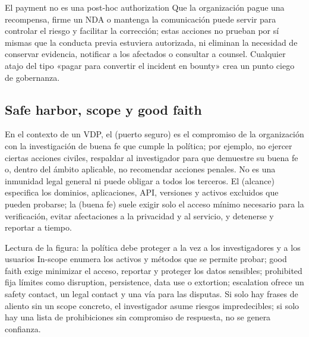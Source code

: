 \begin{warningbox}{El payment no es una post-hoc authorization}
Que la organización pague una recompensa, firme un NDA o mantenga la comunicación puede servir para controlar el riesgo y facilitar la corrección; estas acciones no prueban por sí mismas que la conducta previa estuviera autorizada, ni eliminan la necesidad de conservar evidencia, notificar a los afectados o consultar a counsel. Cualquier atajo del tipo «pagar para convertir el incident en bounty» crea un punto ciego de gobernanza.
\end{warningbox}

\subsection{Safe harbor, scope y good faith}

En el contexto de un VDP, el  (puerto seguro) es el compromiso de la organización con la investigación de buena fe que cumple la política; por ejemplo, no ejercer ciertas acciones civiles, respaldar al investigador para que demuestre su buena fe o, dentro del ámbito aplicable, no recomendar acciones penales. No es una inmunidad legal general ni puede obligar a todos los terceros. El  (alcance) especifica los dominios, aplicaciones, API, versiones y activos excluidos que pueden probarse; la  (buena fe) suele exigir solo el acceso mínimo necesario para la verificación, evitar afectaciones a la privacidad y al servicio, y detenerse y reportar a tiempo.


\begin{knowledgebox}{Lectura de la figura: la política debe proteger a la vez a los investigadores y a los usuarios}
In-scope enumera los activos y métodos que se permite probar; good faith exige minimizar el acceso, reportar y proteger los datos sensibles; prohibited fija límites como disruption, persistence, data use o extortion; escalation ofrece un safety contact, un legal contact y una vía para las disputas. Si solo hay frases de aliento sin un scope concreto, el investigador asume riesgos impredecibles; si solo hay una lista de prohibiciones sin compromiso de respuesta, no se genera confianza.
\end{knowledgebox}

